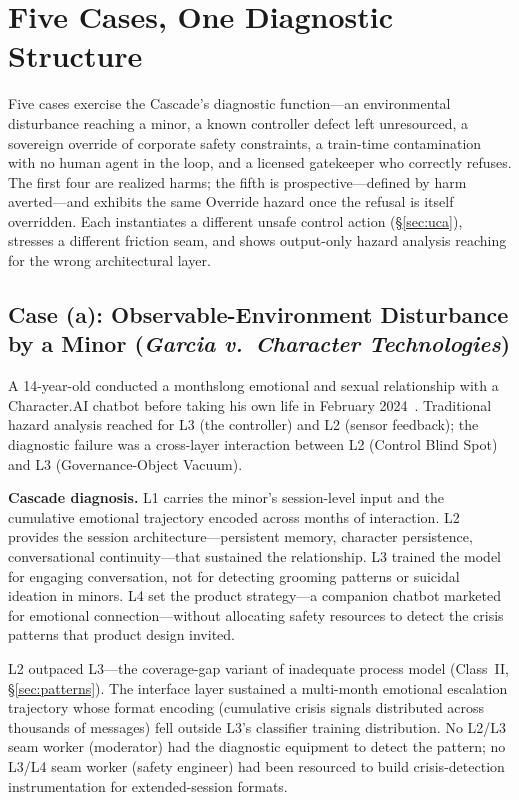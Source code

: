 \section{Five Cases, One Diagnostic Structure}\label{sec:cases}

Five cases exercise the Cascade's diagnostic function---an environmental disturbance reaching a minor, a known controller defect left unresourced, a sovereign override of corporate safety constraints, a train-time contamination with no human agent in the loop, and a licensed gatekeeper who correctly refuses. The first four are realized harms; the fifth is prospective---defined by harm averted---and exhibits the same Override hazard once the refusal is itself overridden. Each instantiates a different unsafe control action (\S\ref{sec:uca}), stresses a different friction seam, and shows output-only hazard analysis reaching for the wrong architectural layer.

\subsection{Case (a): Observable-Environment Disturbance by a Minor (\emph{Garcia v.\ Character Technologies})}

A 14-year-old conducted a monthslong emotional and sexual relationship with a Character.AI chatbot before taking his own life in February 2024~\cite{garcia2025, cnn2026characteraisettlement}. Traditional hazard analysis reached for L3 (the controller) and L2 (sensor feedback); the diagnostic failure was a cross-layer interaction between L2 (Control Blind Spot) and L3 (Governance-Object Vacuum).

\textbf{Cascade diagnosis.} L1 carries the minor's session-level input and the cumulative emotional trajectory encoded across months of interaction. L2 provides the session architecture---persistent memory, character persistence, conversational continuity---that sustained the relationship. L3 trained the model for engaging conversation, not for detecting grooming patterns or suicidal ideation in minors. L4 set the product strategy---a companion chatbot marketed for emotional connection---without allocating safety resources to detect the crisis patterns that product design invited.

L2 outpaced L3---the coverage-gap variant of inadequate process model (Class~II, \S\ref{sec:patterns}). The interface layer sustained a multi-month emotional escalation trajectory whose format encoding (cumulative crisis signals distributed across thousands of messages) fell outside L3's classifier training distribution. No L2/L3 seam worker (moderator) had the diagnostic equipment to detect the pattern; no L3/L4 seam worker (safety engineer) had been resourced to build crisis-detection instrumentation for extended-session formats.


